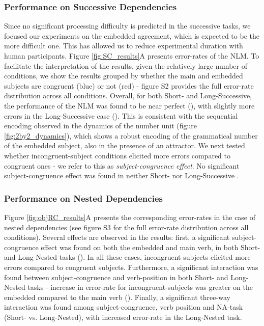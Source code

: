\subsubsection{Performance on Successive Dependencies}
Since no significant processing difficulty is predicted in the successive tasks, we focused our experiments on the embedded agreement, which is expected to be the more difficult one. This has allowed us to reduce experimental duration with human participants. Figure \ref{fig:SC_results}A presents error-rates of the NLM. To facilitate the interpretation of the results, given the relatively large number of conditions, we show the results grouped by whether the main and embedded subjects are congruent (blue) or not (red) - figure S2 provides the full error-rate distribution across all conditions. Overall, for both Short- and Long-Successive, the performance of the NLM was found to be near perfect (), with slightly more errors in the Long-Successive case (). This is consistent with the sequential encoding observed in the dynamics of the number unit (figure \ref{fig:2by2_dynamics}), which shows a robust encoding of the grammatical number of the embedded subject, also in the presence of an attractor. We next tested whether incongruent-subject conditions elicited more errors compared to congruent ones - we refer to this as \textit{subject-congruence effect}. No significant subject-congruence effect was found in neither Short- nor Long-Successive .

\subsubsection{Performance on Nested Dependencies}
Figure \ref{fig:objRC_results}A presents the corresponding error-rates in the case of nested dependencies (see figure S3 for the full error-rate distribution across all conditions). Several effects are observed in the results: first, a significant subject-congruence effect was found on both the embedded and main verb, in both Short- and Long-Nested tasks (). In all these cases, incongruent subjects elicited more errors compared to congruent subjects. Furthermore, a significant interaction was found between subject-congruence and verb-position in both Short- and Long-Nested tasks - increase in error-rate for incongruent-subjects was greater on the embedded compared to the main verb (). Finally, a significant three-way interaction was found among subject-congruence, verb position and NA-task (Short- vs. Long-Nested), with increased error-rate in the Long-Nested task. 

